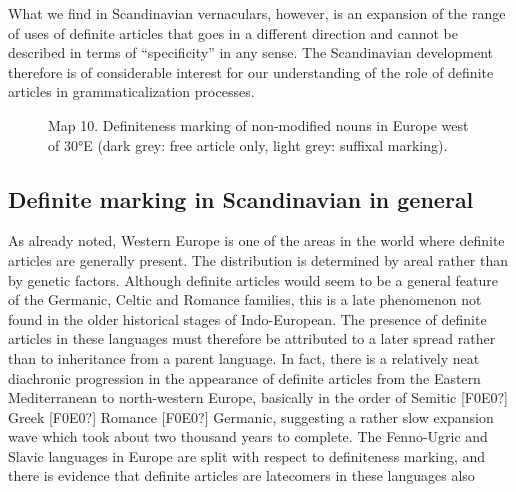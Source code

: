 What we find in Scandinavian vernaculars, however, is an expansion of the range of uses of definite articles that goes in a different direction and cannot be described in terms of “specificity” in any sense. The Scandinavian development therefore is of considerable interest for our understanding of the role of definite articles in grammaticalization processes.




\begin{figure}[h]

\begin{minipage}{5.58403in}

\label{bkm:Ref224379647}Map 10. Definiteness marking of non-modified nouns in Europe west of 30°E (dark grey: free article only, light grey: suffixal marking).


\end{minipage}

\end{figure}

\subsection{\rmfamily Definite marking in Scandinavian in general}
\label{bkm:Ref224380083}
As already noted, Western Europe is one of the areas in the world where definite articles are generally present. The distribution is determined by areal rather than by genetic factors. Although definite articles would seem to be a general feature of the Germanic, Celtic and Romance families, this is a late phenomenon not found in the older historical stages of Indo-European. The presence of definite articles in these languages must therefore be attributed to a later spread rather than to inheritance from a parent language. In fact, there is a relatively neat diachronic progression in the appearance of definite articles from the Eastern Mediterranean to north-western Europe, basically in the order of Semitic [F0E0?] Greek [F0E0?] Romance [F0E0?] Germanic, suggesting a rather slow expansion wave which took about two thousand years to complete. The Fenno-Ugric and Slavic languages in Europe are split with respect to definiteness marking, and there is evidence that definite articles are latecomers in these languages also

